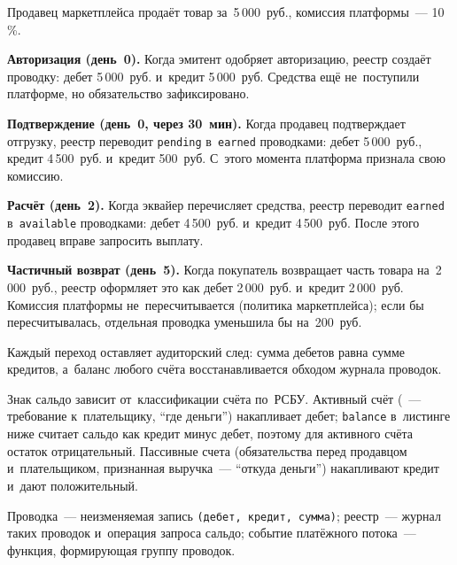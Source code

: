 Продавец маркетплейса продаёт товар за~5\,000~руб., комиссия платформы~---
10\,\%.

\textbf{Авторизация (день~0).} Когда эмитент одобряет авторизацию, реестр создаёт
проводку: дебет  5\,000~руб. и~кредит
 5\,000~руб. Средства ещё не~поступили платформе, но
обязательство зафиксировано.

\textbf{Подтверждение (день~0, через 30~мин).} Когда продавец подтверждает
отгрузку, реестр переводит \texttt{pending} в~\texttt{earned} проводками: дебет
 5\,000~руб., кредит 
4\,500~руб. и~кредит  500~руб. С~этого момента
платформа признала свою комиссию.

\textbf{Расчёт (день~2).} Когда эквайер перечисляет средства, реестр переводит
\texttt{earned} в~\texttt{available} проводками: дебет  4\,500~руб.
и~кредит  4\,500~руб. После этого продавец вправе
запросить выплату.

\textbf{Частичный возврат (день~5).} Когда покупатель возвращает часть товара
на~2\,000~руб., реестр оформляет это как дебет 
2\,000~руб. и~кредит  2\,000~руб. Комиссия платформы
не~пересчитывается (политика маркетплейса); если бы пересчитывалась, отдельная
проводка уменьшила бы  на~200~руб.

Каждый переход оставляет аудиторский след: сумма дебетов равна сумме кредитов,
а~баланс любого счёта восстанавливается обходом журнала проводок.

Знак сальдо зависит от~классификации счёта по~РСБУ. Активный счёт
(~--- требование к~плательщику, \enquote{где
деньги}) накапливает дебет; \texttt{balance} в~листинге ниже считает сальдо
как кредит минус дебет, поэтому для активного счёта остаток отрицательный. Пассивные счета
(обязательства перед продавцом и~плательщиком, признанная выручка~---
\enquote{откуда деньги}) накапливают кредит и~дают положительный.

Проводка~--- неизменяемая запись \texttt{(дебет, кредит, сумма)}; реестр~---
журнал таких проводок и~операция запроса сальдо; событие платёжного потока~---
функция, формирующая группу проводок.

